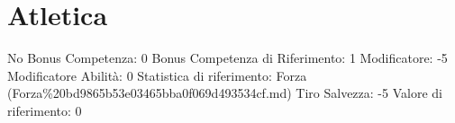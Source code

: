 \section{Atletica}\label{atletica}

\begin{description}
\tightlist
\item[Tags: ABI]
No Bonus Competenza: 0 Bonus Competenza di Riferimento: 1 Modificatore:
-5 Modificatore Abilità: 0 Statistica di riferimento: Forza
(Forza\%20bd9865b53e03465bba0f069d493534cf.md) Tiro Salvezza: -5 Valore
di riferimento: 0
\end{description}
